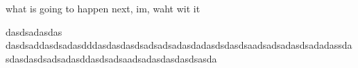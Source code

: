 




what is going to happen next, im, waht wit it









dasdsadasdas
dasdsaddasdsadasdddasdasdasdsadsadsadasdadasdsdasdsaadsadsadasdsadadassdasdasdasdsadsadasddasdsadsaadsadasdasdasdsasda
